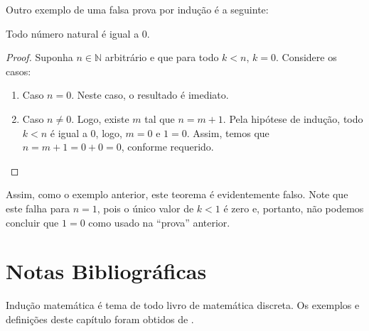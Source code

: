 Outro exemplo de uma falsa prova por indução é a seguinte:

\begin{Theorem}
Todo número natural é igual a $0$.
\end{Theorem}
\begin{proof}
Suponha $n\in\mathbb{N}$ arbitrário e que para todo $k < n$, $k =
0$. Considere os casos:
\begin{enumerate}
  \item[\ ] Caso $n = 0$. Neste caso, o resultado é imediato.
  \item[\ ] Caso $n \neq 0$. Logo, existe $m$ tal que $n = m +
    1$. Pela hipótese de indução, todo $k < n$ é igual a $0$, logo, $m
    = 0$ e $1 = 0$. Assim, temos que $n = m + 1 = 0 + 0 = 0$, conforme requerido.
\end{enumerate}
\end{proof}
Assim, como o exemplo anterior, este teorema é evidentemente
falso. Note que este falha para $n = 1$, pois o único valor de $k < 1$
é zero e, portanto, não podemos concluir que $1 = 0$ como usado na
``prova'' anterior.

\section{Notas Bibliográficas}

Indução matemática é tema de todo livro de matemática discreta. Os
exemplos e definições deste capítulo foram obtidos de \cite{Velleman06}.
